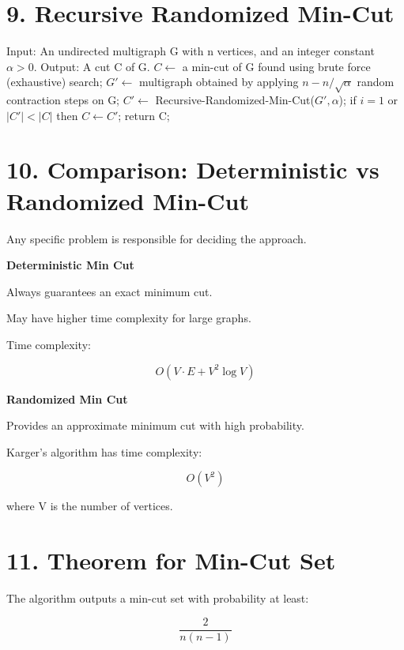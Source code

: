 \documentclass[11pt]{article}
\begin{document}
\section*{9. Recursive Randomized Min-Cut}

\begin{algorithm}
\caption{Algorithm 3: Recursive-Randomized-Min-Cut(G, $\alpha$)}
\begin{algorithmic}
\STATE Input:
\STATE An undirected multigraph G with n vertices, and an integer constant $\alpha > 0$.
\STATE Output:
\STATE A cut C of G.
\STATE $C \leftarrow$ a min-cut of G found using brute force (exhaustive) search;
\ELSE
{}
\STATE $G' \leftarrow$ multigraph obtained by applying $n - n/\sqrt{\alpha}$ random contraction steps on G;
\STATE $C' \leftarrow$ Recursive-Randomized-Min-Cut($G', \alpha$);
\STATE if $i = 1$ or $|C'| < |C|$ then
\STATE $C \leftarrow C'$;
\ENDFOR
\ENDIF
\STATE return C;
\end{algorithmic}
\end{algorithm}

\section*{10. Comparison: Deterministic vs Randomized Min-Cut}

Any specific problem is responsible for deciding the approach.

\textbf{Deterministic Min Cut}

Always guarantees an exact minimum cut.

May have higher time complexity for large graphs.

Time complexity:

\[
O(V \cdot E + V^2 \log V)
\]

\textbf{Randomized Min Cut}

Provides an approximate minimum cut with high probability.

Karger’s algorithm has time complexity:

\[
O(V^2)
\]

where V is the number of vertices.

\section*{11. Theorem for Min-Cut Set}

The algorithm outputs a min-cut set with probability at least:

\[
\frac{2}{n(n-1)}
\]
\end{document}
